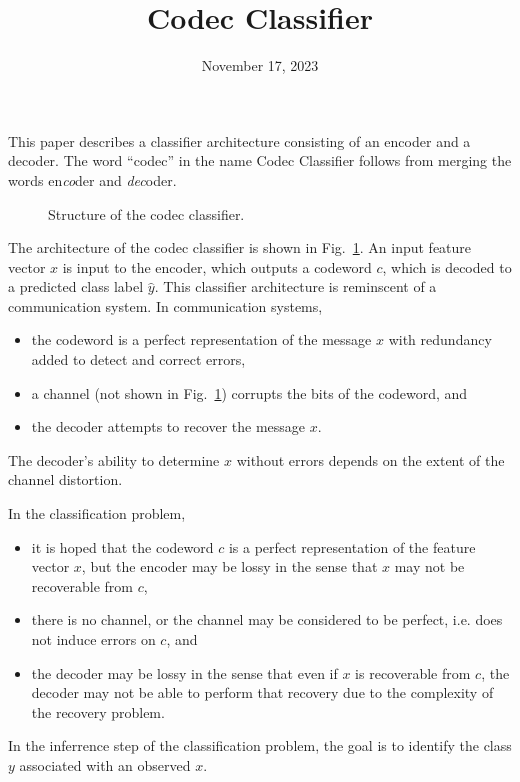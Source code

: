\documentclass{article}
\title{Codec Classifier}
\date{November 17, 2023}
\begin{document}
\maketitle

This paper describes a classifier architecture consisting of an encoder and a decoder.  The word ``codec'' in the name Codec Classifier follows from merging the words en{\it co}der and {\it dec}oder.

\begin{figure}
  \begin{center}
\end{center}
\caption{Structure of the codec classifier.}
\label{fig:arch}
\end{figure}

The architecture of the codec classifier is shown in Fig.~\ref{fig:arch}.  An input feature vector $x$ is input to the encoder, which outputs a codeword $c$, which is decoded to a predicted class label $\hat{y}$.  This classifier architecture is reminscent of a communication system.  In communication systems,
\begin{itemize}
  \item the codeword is a perfect representation of the message $x$ with redundancy added to detect and correct errors,
  \item a channel (not shown in Fig.~\ref{fig:arch}) corrupts the bits of the codeword, and
  \item the decoder attempts to recover the message $x$.
\end{itemize}
The decoder's ability to determine $x$ without errors depends on the extent of the channel distortion.

In the classification problem,
\begin{itemize}
\item it is hoped that the codeword $c$ is a perfect representation of the feature vector $x$, but the encoder may be lossy in the sense that $x$ may not be recoverable from $c$,
\item there is no channel, or the channel may be considered to be perfect, i.e. does not induce errors on $c$, and
\item the decoder may be lossy in the sense that even if $x$ is recoverable from $c$, the decoder may not be able to perform that recovery due to the complexity of the recovery problem.
\end{itemize}
In the inferrence step of the classification problem, the goal is to identify the class $y$ associated with an observed $x$.
\end{document}
